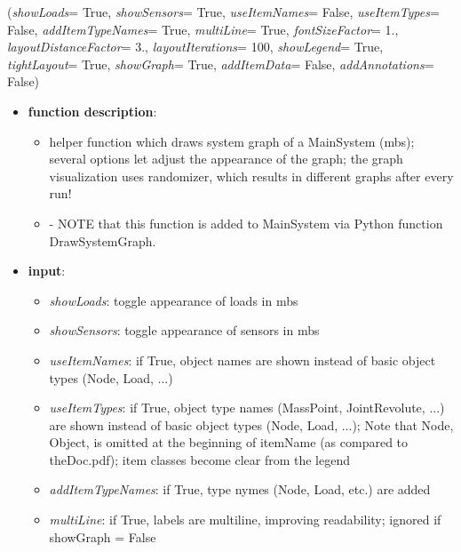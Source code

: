 %
\begin{flushleft}
\label{sec:mainsystemextensions:DrawSystemGraph}
({\it showLoads}= True, {\it showSensors}= True, {\it useItemNames}= False, {\it useItemTypes}= False, {\it addItemTypeNames}= True, {\it multiLine}= True, {\it fontSizeFactor}= 1., {\it layoutDistanceFactor}= 3., {\it layoutIterations}= 100, {\it showLegend}= True, {\it tightLayout}= True, {\it showGraph}= True, {\it addItemData}= False, {\it addAnnotations}= False)
\end{flushleft}
\setlength{\itemindent}{0.7cm}
\begin{itemize}[leftmargin=0.7cm]
\item[--]
{\bf function description}: \vspace{-6pt}
\begin{itemize}[leftmargin=1.2cm]
\setlength{\itemindent}{-0.7cm}
\item[]helper function which draws system graph of a MainSystem (mbs); several options let adjust the appearance of the graph; the graph visualization uses randomizer, which results in different graphs after every run!
\item[]- NOTE that this function is added to MainSystem via Python function DrawSystemGraph.
\end{itemize}
\item[--]
{\bf input}: \vspace{-6pt}
\begin{itemize}[leftmargin=1.2cm]
\setlength{\itemindent}{-0.7cm}
\item[]{\it showLoads}: toggle appearance of loads in mbs
\item[]{\it showSensors}: toggle appearance of sensors in mbs
\item[]{\it useItemNames}: if True, object names are shown instead of basic object types (Node, Load, ...)
\item[]{\it useItemTypes}: if True, object type names (MassPoint, JointRevolute, ...) are shown instead of basic object types (Node, Load, ...); Note that Node, Object, is omitted at the beginning of itemName (as compared to theDoc.pdf); item classes become clear from the legend
\item[]{\it addItemTypeNames}: if True, type nymes (Node, Load, etc.) are added
\item[]{\it multiLine}: if True, labels are multiline, improving readability; ignored if showGraph = False

\end{itemize}
\end{itemize}
